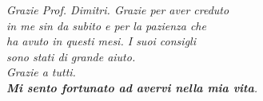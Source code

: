\begin{flushright}
  \vspace{1em}
  \textit{Grazie Prof. Dimitri. Grazie per aver creduto\\ in me sin da subito e per la pazienza che\\ ha avuto in questi mesi. I suoi consigli\\ sono stati di grande aiuto. } \\
  \vspace{1em}
  \textit{Grazie a tutti. \\\textbf{Mi sento fortunato ad avervi nella mia vita}.}

\end{flushright}

\clearpage